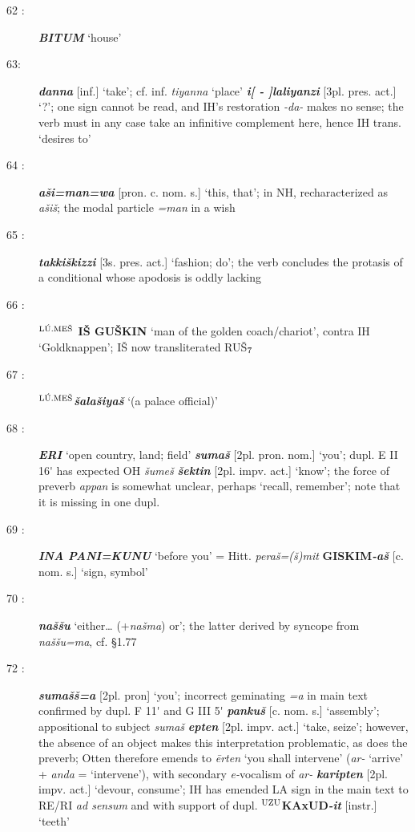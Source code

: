 \documentclass[10pt]{article}
\newcommand{\supersc}[1]{$^{\textrm{\scriptsize{#1}}}$}  	%
\newcommand{\subsc}[1]{$_{\textrm{\scriptsize{#1}}}$}	%
\newcommand{\bit}[1]{\textbf{\textit{#1}}}				%
\newcommand{\p}[1]{{\tiny[{#1}]}}					%
\newcommand{\pr}{\'{ }}									%
\newcommand{\hith}{\textsubwedge{h}}
\newcommand{\men}{\supersc{L\'U.ME\v{S}}}
\renewcommand{\.}[1]{\textsubdot{#1}}
\begin{document}
\begin{description}
\item[62 :] \bit{BITUM} `house'

\item[63:] \bit{danna} \p{inf.} `take'; cf. inf. \textit{tiyanna} `place' \bit{i[ - ]laliyanzi} \p{3pl. pres. act.} `?'; one sign cannot be read, and IH's restoration \textit{-da-} makes no sense; the verb must in any case take an infinitive complement here, hence IH trans. `desires to'

\item[64 :] \bit{a\v{s}i=man=wa} \p{pron. c. nom. s.} `this, that'; in NH, recharacterized as \textit{a\v{s}i\v{s}}; the modal particle \textit{=man} in a wish

\item[65 :] \bit{takki\v{s}kizzi} \p{3s. pres. act.} `fashion; do'; the verb concludes the protasis of a conditional whose apodosis is oddly lacking

\item[66 :] \textbf{{\men} I\v{S} GU\v{S}KIN} `man of the golden coach/chariot', contra IH `Goldknappen'; I\v{S} now transliterated RU\v{S}\subsc{7}

\item[67 :] \textbf{\men}\bit{\v{s}ala\v{s}{\hith}iya\v{s}} `(a palace official)'

\item[68 :] \bit{ERI} `open country, land; field' \bit{suma\v{s}} \p{2pl. pron. nom.} `you'; dupl. E II 16{\pr} has expected OH \textit{\v{s}ume\v{s}} \bit{\v{s}ektin} \p{2pl. impv. act.} `know'; the force of preverb \textit{appan} is somewhat unclear, perhaps `recall, remember'; note that it is missing in one dupl.

\item[69 :] \bit{INA PANI=KUNU} `before you' = Hitt. \textit{pera\v{s}=(\v{s})mit} \textbf{GISKIM}\bit{-a\v{s}} \p{c. nom. s.} `sign, symbol'

\item[70 :] \bit{na\v{s}\v{s}u} `either{\ldots} (+\textit{na\v{s}ma}) or'; the latter derived by syncope from \textit{na\v{s}\v{s}u=ma}, cf.  \S1.77

\item[72 :] \bit{suma\v{s}\v{s}=a} \p{2pl. pron} `you'; incorrect geminating \textit{=a} in main text confirmed by dupl. F 11{\pr} and G III 5{\pr} \bit{panku\v{s}} \p{c. nom. s.} `assembly'; appositional to subject \textit{suma\v{s}} \bit{epten} \p{2pl. impv. act.} `take, seize'; however, the absence of an object makes this interpretation problematic, as does the preverb; Otten therefore emends to \textit{\=erten} `you shall intervene' (\textit{ar-} `arrive' + \textit{anda} = `intervene'), with secondary \textit{e-}vocalism of \textit{ar-} \bit{karipten} \p{2pl. impv. act.} `devour, consume'; IH has emended LA sign in the main text to RE/RI \textit{ad sensum} and with support of dupl. \textbf{\supersc{UZU}KAxUD}\bit{-it} \p{instr.} `teeth'


\end{description}
\end{document}
